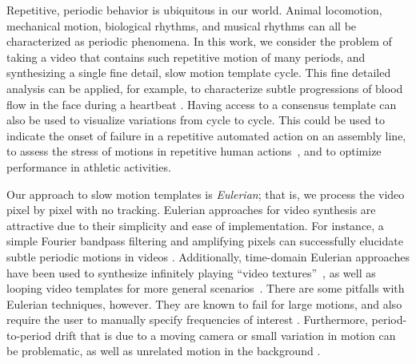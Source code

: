 \documentclass{article}
\begin{document}
Repetitive, periodic behavior is ubiquitous in our world. Animal locomotion, mechanical motion, biological rhythms, and musical rhythms can all be characterized as periodic phenomena.  In this work, we consider the problem of taking a video that contains such repetitive motion of many periods, and synthesizing a single fine detail, slow motion template cycle.  This fine detailed analysis can be applied, for example, to characterize subtle progressions of blood flow in the face during a heartbeat \cite{kumar2015distanceppg}.  Having access to a consensus template can also be used to visualize variations from cycle to cycle. This could be used to indicate the onset of failure in a repetitive automated action on an assembly line, to assess the stress of motions in repetitive human actions~\cite{greene2017visualizing}, and to optimize performance in athletic activities.

Our approach to slow motion templates is {\em Eulerian}; that is, we process the video pixel by pixel with no tracking.  Eulerian approaches for video synthesis are attractive due to their simplicity and ease of implementation.  For instance, a simple Fourier bandpass filtering and amplifying pixels can successfully elucidate subtle periodic motions in videos \cite{wu2012eulerian, wadhwa2013phase}.  Additionally, time-domain Eulerian approaches have been used to synthesize infinitely playing ``video textures''~\cite{schodl2000video}, as well as looping video templates for more general scenarios~\cite{Liao2013VideoLoops,Liao2015VideoLoops}.  There are some pitfalls with Eulerian techniques, however.  They are known to fail for large motions, and also require the user to manually specify frequencies of interest \cite{wu2012eulerian, wadhwa2013phase}.  Furthermore, period-to-period drift that is due to a moving camera or small variation in motion can be problematic, as well as unrelated motion in the background \cite{stauffer1999adaptive}.
\end{document}
